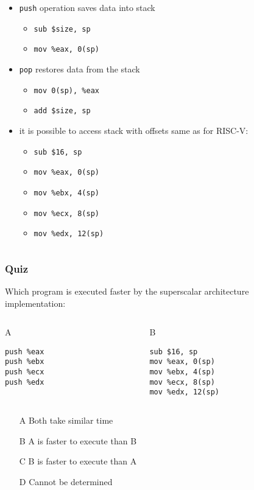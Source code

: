 \documentclass{beamer}
\begin{document}
\begin{frame}
\begin{columns}
\begin{column}{0.55\textwidth}  
\small
\begin{itemize}
\item \texttt{push} operation saves data into stack
\begin{itemize}
\item \texttt{sub \$size, sp}
\item \texttt{mov \%eax, 0(sp)}
\end{itemize}
\item \texttt{pop} restores data from the stack
\begin{itemize}
\item \texttt{mov 0(sp), \%eax}
\item \texttt{add \$size, sp}
\end{itemize}
\item it is possible to access stack with offsets same as for RISC-V:
\begin{itemize}
\item \texttt{sub \$16, sp}
\item \texttt{mov \%eax, 0(sp)}
\item \texttt{mov \%ebx, 4(sp)}
\item \texttt{mov \%ecx, 8(sp)}
\item \texttt{mov \%edx, 12(sp)}
\end{itemize}
\end{itemize}
\end{column}
\end{columns}
\end{frame}


\begin{frame}[fragile]
\frametitle{Quiz}

Which program is executed faster by the superscalar architecture implementation:
\begin{columns}
\begin{column}{0.45\textwidth}
A
\begin{verbatim}
push %eax
push %ebx
push %ecx
push %edx
\end{verbatim}
\end{column}
\hfill
\begin{column}{0.45\textwidth}  
B
\begin{verbatim}
sub $16, sp
mov %eax, 0(sp)
mov %ebx, 4(sp)
mov %ecx, 8(sp)
mov %edx, 12(sp)
\end{verbatim}
\end{column}
\end{columns}

\begin{itemize}
\item[A] Both take similar time
\item[B] A is faster to execute than B
\item[C] B is faster to execute than A
\item[D] Cannot be determined
\end{itemize}
\end{frame}
\end{document}
